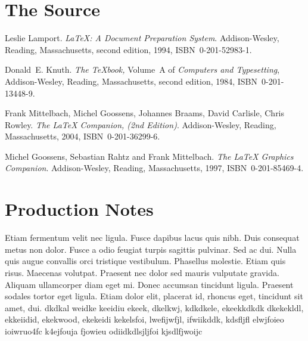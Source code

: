 \documentclass[a4paper,12pt]{book}
\begin{document}
\chapter{The Source}

{\tiny }


\begin{thebibliography}{99}
 Leslie Lamport.  \newblock \emph{{\LaTeX:} A Document
    Preparation System}.  \newblock Addison-Wesley, Reading,
  Massachusetts, second edition, 1994, ISBN~0-201-52983-1.
  
 Donald~E. Knuth.  \newblock \textit{The \TeX{}book,}
  Volume~A of \textit{Computers and Typesetting}, Addison-Wesley,
  Reading, Massachusetts, second edition, 1984, ISBN~0-201-13448-9.

 Frank Mittelbach, Michel Goossens, Johannes Braams,
  David Carlisle, Chris Rowley.  \newblock \emph{The {\LaTeX} Companion, (2nd
  Edition)}.  \newblock Addison-Wesley, Reading, Massachusetts, 2004,
  ISBN~0-201-36299-6.

 Michel Goossens, Sebastian Rahtz and Frank
  Mittelbach.  \newblock \emph{The {\LaTeX} Graphics Companion}.  \newblock
  Addison-Wesley, Reading, Massachusetts, 1997, ISBN~0-201-85469-4.
 
\end{thebibliography}

\printindex

\backmatter

\chapter{Production Notes}

Etiam fermentum velit nec ligula. Fusce dapibus lacus quis nibh. Duis
consequat metus non dolor. Fusce a odio feugiat turpis sagittis
pulvinar. Sed ac dui. Nulla quis augue convallis orci tristique
vestibulum. Phasellus molestie. Etiam quis risus. Maecenas
volutpat. Praesent nec dolor sed mauris vulputate gravida. Aliquam
ullamcorper diam eget mi. Donec accumsan tincidunt ligula. Praesent
sodales tortor eget ligula. Etiam dolor elit, placerat id, rhoncus
eget, tincidunt sit amet, dui. dkdkal weidke keeidiu ekeek, dkelkwj, 
kdkdkele, ekeekkdkdk dkekekldl, ekkeiidid, ekekwood, ekekeidi
kekelsfoi, lwefijwfjl, ifwiikddk, kdsfljfl elwjfoieo ioiwruo4fc
k4ejfouja fjowieu odiidkdlsjljfoi kjsdlfjwoijc
\end{document}
